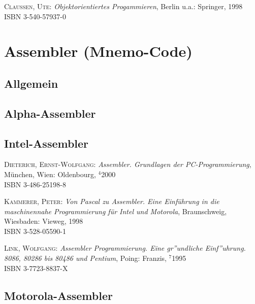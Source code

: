 \begin{description}

\item \textsc{Claussen, Ute}:
\textit{Objektorientiertes Progammieren},
Berlin u.a.: Springer, 1998 \\
ISBN 3-540-57937-0

\end{description}



\section{Assembler (Mnemo-Code)}

\subsection{Allgemein}

\subsection{Alpha-Assembler}

\subsection{Intel-Assembler}

\begin{description}
  
\item \textsc{Dieterich, Ernst-Wolfgang}: \textit{Assembler.
    Grundlagen der PC-Programmierung},
  M\"unchen, Wien: Oldenbourg, $^4$2000 \\
  ISBN 3-486-25198-8
  
\item \textsc{Kammerer, Peter}: \textit{Von Pascal zu Assembler. Eine
    Einf\"uhrung in die maschinennahe Programmierung f\"ur Intel und
    Motorola},
  Braunschweig, Wiesbaden: Vieweg, 1998 \\
  ISBN 3-528-05590-1
  
\item \textsc{Link, Wolfgang}: \textit{Assembler Programmierung.  Eine
    gr''undliche Einf''uhrung. 8086, 80286 bis 80486 und Pentium},
  Poing: Franzis, $^7$1995 \\
  ISBN 3-7723-8837-X

\end{description}

\subsection{Motorola-Assembler}

